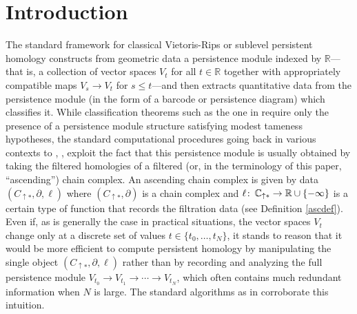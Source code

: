 \documentclass[11pt]{amsart}
\theoremstyle{definition}
\theoremstyle{remark}
\numberwithin{equation}{section}
\def\co{\colon\thinspace}
\def\R{\mathbb{R}}
\def\C{\mathbb{C}}
\begin{document}
\section{Introduction}
The standard framework for classical Vietoris-Rips or sublevel persistent homology constructs from geometric data a persistence module indexed by $\R$---that is, a collection of vector spaces $V_t$ for all $t\in \R$ together with appropriately compatible maps $V_s\to V_t$ for $s\leq t$---and then extracts quantitative data from the persistence module (in the form of a barcode or persistence diagram) which classifies it.  While classification theorems such as the one in \cite{CB} require only the presence of a persistence module structure satisfying modest tameness hypotheses, the standard computational procedures going back in various contexts to \cite{Bar}, \cite{ELZ}, \cite{ZC} exploit the fact that this persistence module is usually obtained by taking the filtered homologies of a filtered (or, in the terminology of this paper, ``ascending'') chain complex.   An ascending chain complex is given by data $(C_{\uparrow *},\partial,\ell)$ where $(C_{\uparrow *},\partial)$ is a chain complex and $\ell\co \C_{\uparrow *}\to\R\cup\{-\infty\}$ is a certain type of function that records the filtration data (see Definition \ref{ascdef}).  Even if, as is generally the case in practical situations, the vector spaces $V_t$ change only at a discrete set of values $t\in \{t_0,\ldots,t_N\}$,  it stands to reason that it would be more efficient to compute persistent homology by manipulating the single object $(C_{\uparrow *},\partial,\ell)$  rather than by recording and analyzing the full persistence module $V_{t_0}\to V_{t_1}\to\cdots\to V_{t_N}$, which often contains much redundant information when $N$ is large.  The standard algorithms as in \cite{ZC} corroborate this intuition.
\end{document}
